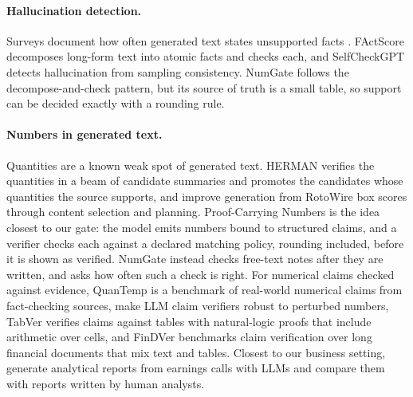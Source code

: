 \documentclass[11pt]{article}
\begin{document}
\paragraph{Hallucination detection.} Surveys document how often generated text states unsupported facts \citep{ji2023survey}. FActScore \citep{min2023factscore} decomposes long-form text into atomic facts and checks each, and SelfCheckGPT \citep{manakul2023selfcheckgpt} detects hallucination from sampling consistency. NumGate follows the decompose-and-check pattern, but its source of truth is a small table, so support can be decided exactly with a rounding rule.

\paragraph{Numbers in generated text.} Quantities are a known weak spot of generated text. HERMAN \citep{zhao2020herman} verifies the quantities in a beam of candidate summaries and promotes the candidates whose quantities the source supports, and \citet{puduppully2019content} improve generation from RotoWire box scores through content selection and planning. Proof-Carrying Numbers \citep{solatorio2025pcn} is the idea closest to our gate: the model emits numbers bound to structured claims, and a verifier checks each against a declared matching policy, rounding included, before it is shown as verified. NumGate instead checks free-text notes after they are written, and asks how often such a check is right. For numerical claims checked against evidence, QuanTemp \citep{venktesh2024quantemp} is a benchmark of real-world numerical claims from fact-checking sources, \citet{aarnes2026robust} make LLM claim verifiers robust to perturbed numbers, TabVer \citep{aly2024tabver} verifies claims against tables with natural-logic proofs that include arithmetic over cells, and FinDVer \citep{zhao2024findver} benchmarks claim verification over long financial documents that mix text and tables. Closest to our business setting, \citet{goldsack2025facts} generate analytical reports from earnings calls with LLMs and compare them with reports written by human analysts.
\end{document}
